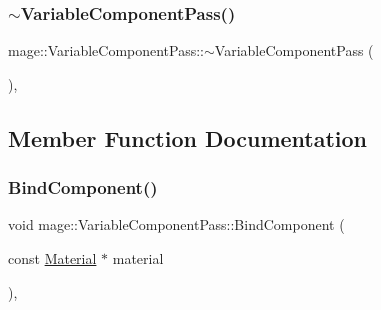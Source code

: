 \hypertarget{classmage_1_1_variable_component_pass_addf03c307a88e6a1871f0ec3adbb8bcb}{}\label{classmage_1_1_variable_component_pass_addf03c307a88e6a1871f0ec3adbb8bcb} 
\subsubsection{\texorpdfstring{$\sim$\+Variable\+Component\+Pass()}{~VariableComponentPass()}}
{\footnotesize\ttfamily mage\+::\+Variable\+Component\+Pass\+::$\sim$\+Variable\+Component\+Pass (\begin{DoxyParamCaption}{ }\end{DoxyParamCaption})\hspace{0.3cm}{\ttfamily [virtual]}, {\ttfamily [default]}}



\subsection{Member Function Documentation}
\hypertarget{classmage_1_1_variable_component_pass_a4046b8c6773eab2b66af1caf7bbebb66}{}\label{classmage_1_1_variable_component_pass_a4046b8c6773eab2b66af1caf7bbebb66} 
\subsubsection{\texorpdfstring{Bind\+Component()}{BindComponent()}}
{\footnotesize\ttfamily void mage\+::\+Variable\+Component\+Pass\+::\+Bind\+Component (\begin{DoxyParamCaption}\item[{const \hyperlink{structmage_1_1_material}{Material} $\ast$}]{material }\end{DoxyParamCaption})\hspace{0.3cm}{\ttfamily [private]}, {\ttfamily [noexcept]}}

\hypertarget{classmage_1_1_variable_component_pass_a9df39d8323fea2b411a4f84abe8bac3c}{}\label{classmage_1_1_variable_component_pass_a9df39d8323fea2b411a4f84abe8bac3c} 
